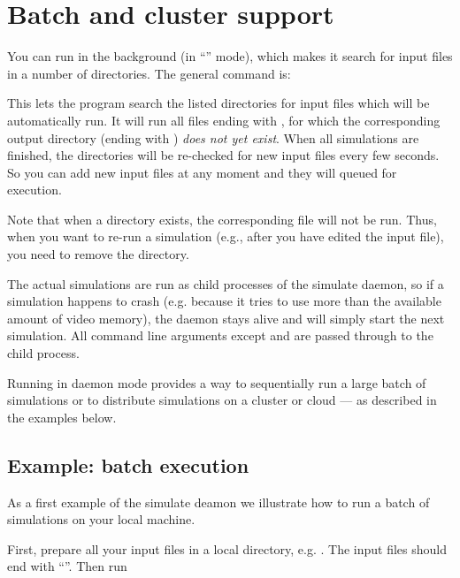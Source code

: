 \section{Batch and cluster support}\label{daemon}


You can run \prog in the background (in ``'' mode), which makes it search for input files in a number of directories. The general command is:


This lets the program search the listed directories for input files which will be automatically run. It will run all files ending with , for which the corresponding output directory (ending with ) \emph{does not yet exist}.  When all simulations are finished, the directories will be re-checked for new input files every few seconds. So you can add new input files at any moment and they will queued for execution.

Note that when a directory  exists, the corresponding  file will not be run. Thus, when you want to re-run a simulation (e.g., after you have edited the input file), you need to remove the 
 directory.

The actual simulations are run as child processes of the simulate daemon, so if a simulation happens to crash (e.g. because it tries to use more than the available amount of video memory), the daemon stays alive and will simply start the next simulation. All command line arguments except  and  are passed through to the child process.

Running in daemon mode provides a way to sequentially run a large batch of simulations or to distribute simulations on a cluster or cloud --- as described in the examples below.

\subsection{Example: batch execution}

As a first example of the simulate deamon we illustrate how to run a batch of simulations on your local machine.

First, prepare all your input files in a local directory, e.g. . The input files should end with ``''. Then run


